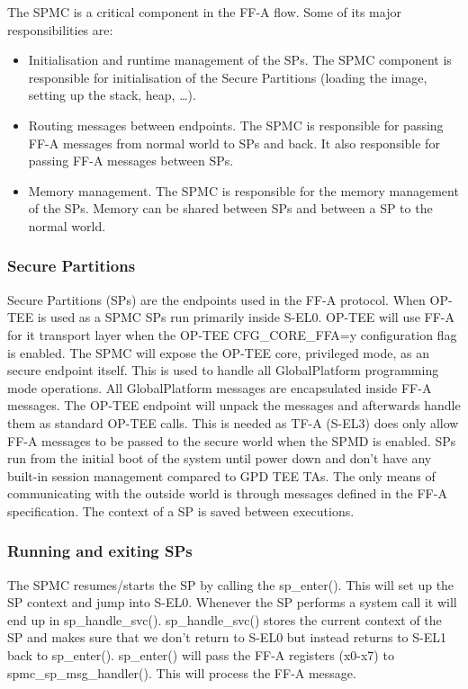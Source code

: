 \documentclass{article}
\begin{document}
The SPMC is a critical component in the FF-A flow. Some of its major responsibilities are: \begin{itemize}
\item Initialisation and runtime management of the SPs. The SPMC component is responsible for initialisation of the Secure Partitions (loading the image, setting up the stack, heap, …).
\item Routing messages between endpoints. The SPMC is responsible for passing FF-A messages from normal world to SPs and back. It also responsible for passing FF-A messages between SPs.
\item Memory management. The SPMC is responsible for the memory management of the SPs. Memory can be shared between SPs and between a SP to the normal world.
\end{itemize}

\subsubsection{Secure Partitions}

Secure Partitions (SPs) are the endpoints used in the FF-A protocol. When OP-TEE is used as a SPMC SPs run primarily inside S-EL0. OP-TEE will use FF-A for it transport layer when the OP-TEE CFG\_CORE\_FFA=y configuration flag is enabled. The SPMC will expose the OP-TEE core, privileged mode, as an secure endpoint itself. This is used to handle all GlobalPlatform programming mode operations. All GlobalPlatform messages are encapsulated inside FF-A messages. The OP-TEE endpoint will unpack the messages and afterwards handle them as standard OP-TEE calls. This is needed as TF-A (S-EL3) does only allow FF-A messages to be passed to the secure world when the SPMD is enabled. SPs run from the initial boot of the system until power down and don’t have any built-in session management compared to GPD TEE TAs. The only means of communicating with the outside world is through messages defined in the FF-A specification. The context of a SP is saved between executions.

\subsubsection{Running and exiting SPs}

The SPMC resumes/starts the SP by calling the sp\_enter(). This will set up the SP context and jump into S-EL0. Whenever the SP performs a system call it will end up in sp\_handle\_svc(). sp\_handle\_svc() stores the current context of the SP and makes sure that we don’t return to S-EL0 but instead returns to S-EL1 back to sp\_enter(). sp\_enter() will pass the FF-A registers (x0-x7) to spmc\_sp\_msg\_handler(). This will process the FF-A message.
\end{document}
